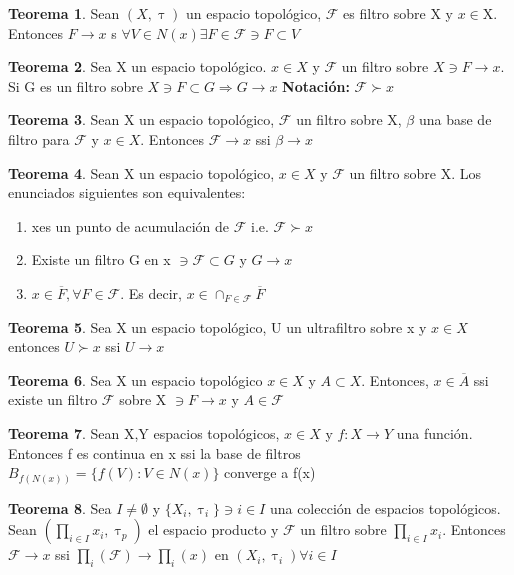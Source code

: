 \documentclass{article}
\theoremstyle{definition}
\newtheorem{theorem}{Teorema}[section]
\begin{document}
\begin{theorem}
	Sean $(X,\uptau)$ un espacio topológico, $\mathcal{F}$ es filtro sobre X y $x\in$X. Entonces $F\to x$ s $\forall V\in N(x)\exists F\in\mathcal{F}\ni F\subset V$
\end{theorem}
\begin{theorem}
	Sea X un espacio topológico. $x\in X$ y $\mathcal{F}$ un filtro sobre $X\ni F\to x$. Si G es un filtro sobre $X\ni F\subset G\Rightarrow G\to x$
	\textbf{Notación: } $\mathcal{F} \succ x$
\end{theorem}
\begin{theorem}
	Sean X un espacio topológico, $\mathcal{F}$ un filtro sobre X, $\beta$ una base de filtro para $\mathcal{F}$ y $x\in X$. Entonces $\mathcal{F}\to x$ ssi $\beta \to x$
\end{theorem}
\begin{theorem}
	Sean X un espacio topológico, $x\in X$ y $\mathcal{F}$ un filtro sobre X. Los enunciados siguientes son equivalentes:
	\begin{enumerate}
		\item xes un punto de acumulación de $\mathcal{F}$ i.e. $\mathcal{F} \succ x$
		\item Existe un filtro G en x $\ni\mathcal{F}\subset G$ y $G\to x$
		\item $x\in \overline{F}, \forall F \in \mathcal{F}$. Es decir, $x\in \cap_{F\in\mathcal{F}}\overline{F}$ 
	\end{enumerate}
\end{theorem}
\begin{theorem}
	Sea X un espacio topológico, U un ultrafiltro sobre x y $x\in X$ entonces $U \succ x$ ssi $U\to x$
\end{theorem}
\begin{theorem}
	Sea X un espacio topológico $x\in X$ y $A\subset X$. Entonces, $x\in\overline{A}$ ssi existe un filtro $\mathcal{F}$ sobre X $\ni F\to x$ y $A\in\mathcal{F}$
\end{theorem}
\begin{theorem}
	Sean X,Y espacios topológicos, $x\in X$  y $f:X\to Y$ una función. Entonces f es continua en x ssi la base de filtros $B_{f(N(x))}=\{f(V):V\in N(x)\}$ converge a f(x)
\end{theorem}
\begin{theorem}
	Sea $I\neq\emptyset$ y $\{X_i,\uptau_i\}\ni i\in I$ una colección de espacios topológicos. Sean $(\prod_{i\in I}x_i,\uptau_p)$ el espacio producto y $\mathcal{F}$ un filtro sobre $\prod_{i\in I}x_i$. Entonces $\mathcal{F}\to x$ ssi $\prod_{i}(\mathcal{F})\to \prod_i(x)$ en $(X_i,\uptau_i) \forall i\in I$
\end{theorem}
\end{document}
